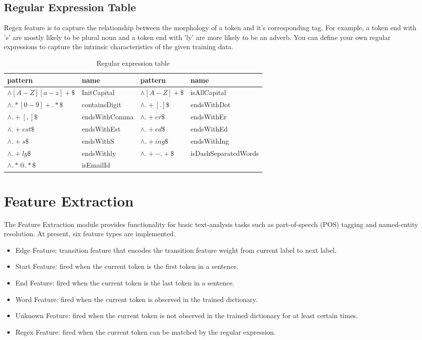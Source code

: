 \subsection{Regular Expression Table}
  Regex feature is to capture the relationship between the morphology of a token and it's corresponding tag.
For example, a token end with 's' are mostly likely to be plural noun and a token end with 'ly' are more likely to be an
adverb. You can define your own regular expressions to capture the intrinsic characteristics of the given training data.
\begin {table}[h]
\caption {Regular expression table} \label{tab:title} 
\begin{center}
\begin{tabular}{ll||ll}
  pattern & name             & pattern & name\\
  \hline                        
  $\wedge[A-Z][a-z]+\$$    & InitCapital       & $\wedge[A-Z]+\$$  & isAllCapital \\
  $\wedge.*[0-9]+.*\$$     & containsDigit     & $\wedge.+[.]\$$   & endsWithDot\\
  $\wedge.+[,]\$$          & endsWithComma     & $\wedge.+er\$$    & endsWithEr\\
  $\wedge.+est\$$	   & endsWithEst       & $\wedge.+ed\$$    & endsWithEd\\
  $\wedge.+s\$$	           & endsWithS         & $\wedge.+ing\$$   & endsWithIng\\
  $\wedge.+ly\$$	   & endsWithly        & $\wedge.+-.+\$$   & isDashSeparatedWords\\
  $\wedge.*@.*\$$	   & isEmailId         &           & \\
  \hline  
\end{tabular}
\end{center}
\end{table}

\section{Feature Extraction}
The Feature Extraction module provides functionality for basic text-analysis
tasks such as part-of-speech (POS) tagging and named-entity resolution.
At present, six feature types are implemented.
    \begin{itemize}
    \item Edge Feature: transition feature that encodes the transition feature weight from current label to next label.
    \item Start Feature: fired when the current token is the first token in a sentence.
    \item End Feature: fired when the current token is the last token in a sentence.
    \item Word Feature: fired when the current token is observed in the trained dictionary.
    \item Unknown Feature: fired when the current token is not observed in the trained dictionary for at least certain times.
    \item Regex Feature: fired when the current token can be matched by the regular expression.
    \end{itemize}

